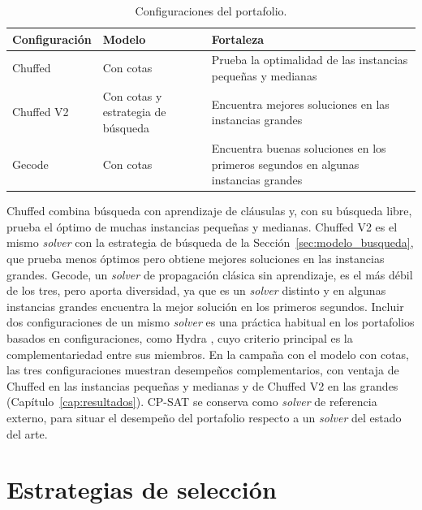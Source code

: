 \begin{table}[H]
  \centering
  \small
  \singlespacing
  \caption{Configuraciones del portafolio.}
  \label{tab:configuraciones}
  \begin{tabularx}{\textwidth}{l l >{\raggedright\arraybackslash}X}
    \toprule
    \textbf{Configuración} & \textbf{Modelo} & \textbf{Fortaleza} \\
    \midrule
    Chuffed & Con cotas & Prueba la optimalidad de las instancias pequeñas y
      medianas \\
    Chuffed V2 & Con cotas y estrategia de búsqueda & Encuentra mejores
      soluciones en las instancias grandes \\
    Gecode & Con cotas & Encuentra buenas soluciones en los primeros segundos
      en algunas instancias grandes \\
    \bottomrule
  \end{tabularx}
\end{table}

Chuffed combina búsqueda con aprendizaje de cláusulas y, con su búsqueda
libre, prueba el óptimo de muchas instancias pequeñas y medianas. Chuffed V2 es
el mismo \textit{solver} con la estrategia de búsqueda de la
Sección~\ref{sec:modelo_busqueda}, que prueba menos óptimos pero obtiene
mejores soluciones en las instancias grandes. Gecode, un \textit{solver} de
propagación clásica sin aprendizaje, es el más débil de los tres, pero aporta
diversidad, ya que es un \textit{solver} distinto y en algunas instancias
grandes encuentra la mejor solución en los primeros segundos.
Incluir dos configuraciones de un mismo \textit{solver} es una práctica
habitual en los portafolios basados en configuraciones, como Hydra
\citep{xu2010hydra}, cuyo criterio principal es la complementariedad entre sus
miembros. En la campaña con el modelo con cotas, las tres configuraciones
muestran desempeños complementarios, con ventaja de Chuffed en las instancias
pequeñas y medianas y de Chuffed V2 en las grandes
(Capítulo~\ref{cap:resultados}). CP-SAT se conserva como \textit{solver} de
referencia externo, para situar el desempeño del portafolio respecto a un
\textit{solver} del estado del arte.

\section{Estrategias de selección}
\label{sec:estrategias}

